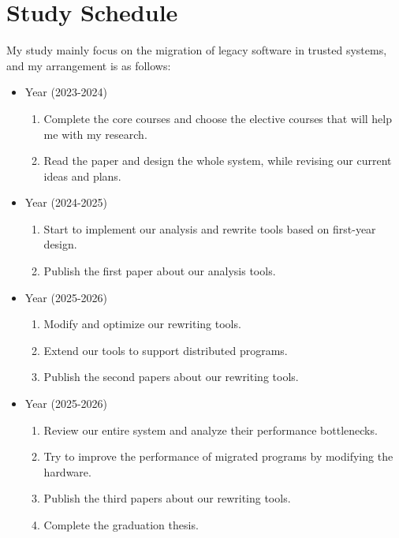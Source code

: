 \section{Study Schedule}
My study mainly focus on the migration of legacy software in trusted systems,
and my arrangement is as follows:

\begin{itemize}
    \item {} Year (2023-2024)
    \begin{enumerate}
        \item Complete the core courses and choose the elective courses
        that will help me with my research. 
        \item Read the paper and design the whole system, while revising
        our current ideas and plans.
    \end{enumerate}
    \item {} Year (2024-2025)
        \begin{enumerate}
            \item Start to implement our analysis and rewrite tools based on
            first-year design.
            \item Publish the first paper about our analysis tools.
        \end{enumerate}
    \item {} Year (2025-2026)
        \begin{enumerate}
            \item Modify and optimize our rewriting tools.
            \item Extend our tools to support distributed programs.
            \item Publish the second papers about our rewriting tools.
        \end{enumerate}
    \item {} Year (2025-2026)
        \begin{enumerate}
            \item Review our entire system and analyze their performance bottlenecks.
            \item Try to improve the performance of migrated programs by
            modifying the hardware.
            \item Publish the third papers about our rewriting tools.
            \item Complete the graduation thesis. 
        \end{enumerate}
\end{itemize}


